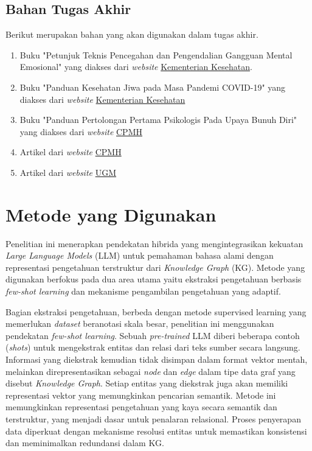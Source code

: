 \subsection{Bahan Tugas Akhir}
Berikut merupakan bahan yang akan digunakan dalam tugas akhir.
\begin{enumerate}
	\item Buku "Petunjuk Teknis Pencegahan dan Pengendalian Gangguan Mental Emosional" yang diakses dari \textit{website} \href{https://repository.kemkes.go.id/book/1258}{Kementerian Kesehatan}.
	\item Buku "Panduan Kesehatan Jiwa pada Masa Pandemi COVID-19" yang diakses dari \textit{website} \href{https://pusatkrisis.kemkes.go.id/panduan-kesehatan-jiwa-pada-masa-pandemi-covid-19}{Kementerian Kesehatan}
	\item Buku "Panduan Pertolongan Pertama Psikologis Pada Upaya Bunuh Diri" yang diakses dari \textit{website} \href{https://cpmh.psikologi.ugm.ac.id/wp-content/uploads/sites/39/2021/11/Panduan-Pertolongan-Pertama-Pencegahan-Bunuh-Diri_v1.pdf}{CPMH}
	\item Artikel dari \textit{website} \href{https://cpmh.psikologi.ugm.ac.id/}{CPMH}
	\item Artikel dari \textit{website} \href{https://ugm.ac.id}{UGM}
\end{enumerate}

\section{Metode yang Digunakan}
Penelitian ini menerapkan pendekatan hibrida yang mengintegrasikan kekuatan \textit{Large Language Models} (LLM) untuk pemahaman bahasa alami dengan representasi pengetahuan terstruktur dari \textit{Knowledge Graph} (KG).
Metode yang digunakan berfokus pada dua area utama yaitu ekstraksi pengetahuan berbasis \textit{few-shot learning} dan mekanisme pengambilan pengetahuan yang adaptif.

Bagian ekstraksi pengetahuan, berbeda dengan metode supervised learning yang memerlukan \textit{dataset} beranotasi skala besar, penelitian ini menggunakan pendekatan \textit{few-shot learning}.
Sebuah \textit{pre-trained} LLM diberi beberapa contoh (\textit{shots}) untuk mengekstrak entitas dan relasi dari teks sumber secara langsung.
Informasi yang diekstrak kemudian tidak disimpan dalam format vektor mentah, melainkan direpresentasikan sebagai \textit{node} dan \textit{edge} dalam tipe data graf yang disebut \textit{Knowledge Graph}.
Setiap entitas yang diekstrak juga akan memiliki representasi vektor yang memungkinkan pencarian semantik.
Metode ini memungkinkan representasi pengetahuan yang kaya secara semantik dan terstruktur, yang menjadi dasar untuk penalaran relasional.
Proses penyerapan data diperkuat dengan mekanisme resolusi entitas untuk memastikan konsistensi dan meminimalkan redundansi dalam KG.

